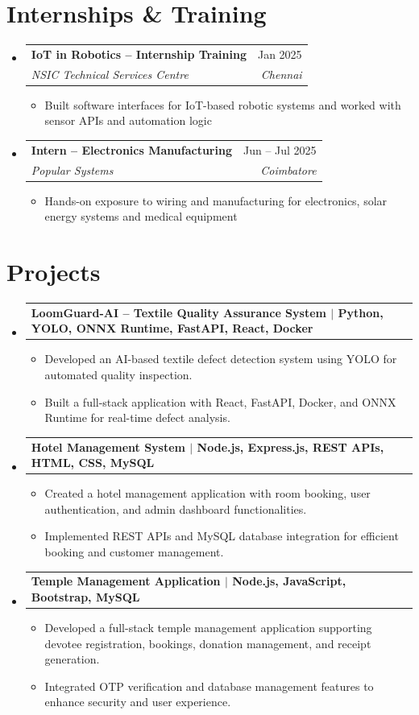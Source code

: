 \documentclass[letterpaper,10.5pt]{article}
\makeatletter
\newcommand{\resumeItem}[1]{
  \item\small{#1}
}
\newcommand{\resumeSubheading}[4]{
  \vspace{1pt}\item
  \begin{tabular*}{1.0\textwidth}[t]{l@{\extracolsep{\fill}}r}
    \textbf{#1} & \small #2 \\
    \textit{\small#3} & \textit{\small #4} \\
  \end{tabular*}\vspace{-4pt}
}
\newcommand{\resumeProjectHeading}[2]{
  \item
  \begin{tabular*}{1.0\textwidth}{l@{\extracolsep{\fill}}r}
    \textbf{#1} & \small #2\\
  \end{tabular*}\vspace{-4pt}
}
\newcommand{\resumeSubHeadingListStart}{\begin{itemize}[leftmargin=0in,label={},itemsep=4pt]}
\newcommand{\resumeSubHeadingListEnd}{\end{itemize}}
\newcommand{\resumeItemListStart}{\begin{itemize}[leftmargin=0.18in,itemsep=2pt]}
\newcommand{\resumeItemListEnd}{\end{itemize}\vspace{-4pt}}
\makeatother
\begin{document}
\section{Internships \& Training}
\resumeSubHeadingListStart

\resumeSubheading
{IoT in Robotics -- Internship Training}{Jan 2025}
{NSIC Technical Services Centre}{Chennai}
\resumeItemListStart
\resumeItem{Built software interfaces for IoT-based robotic systems and worked with sensor APIs and automation logic}
\resumeItemListEnd

\resumeSubheading
{Intern -- Electronics Manufacturing}{Jun -- Jul 2025}
{Popular Systems}{Coimbatore}
\resumeItemListStart
\resumeItem{Hands-on exposure to wiring and manufacturing for electronics, solar energy systems and medical equipment}
\resumeItemListEnd

\resumeSubHeadingListEnd

\section{Projects}
\resumeSubHeadingListStart

\resumeProjectHeading
{LoomGuard-AI -- Textile Quality Assurance System $|$ Python, YOLO, ONNX Runtime, FastAPI, React, Docker}{}
\resumeItemListStart
\resumeItem{Developed an AI-based textile defect detection system using YOLO for automated quality inspection.}
\resumeItem{Built a full-stack application with React, FastAPI, Docker, and ONNX Runtime for real-time defect analysis.}
\resumeItemListEnd

\resumeProjectHeading
{Hotel Management System $|$ Node.js, Express.js, REST APIs, HTML, CSS, MySQL}{}
\resumeItemListStart
\resumeItem{Created a hotel management application with room booking, user authentication, and admin dashboard functionalities.}
\resumeItem{Implemented REST APIs and MySQL database integration for efficient booking and customer management.}
\resumeItemListEnd

\resumeProjectHeading
{Temple Management Application $|$ Node.js, JavaScript, Bootstrap, MySQL}{}
\resumeItemListStart
\resumeItem{Developed a full-stack temple management application supporting devotee registration, bookings, donation management, and receipt generation.}
\resumeItem{Integrated OTP verification and database management features to enhance security and user experience.}
\resumeItemListEnd

\resumeSubHeadingListEnd
\end{document}
